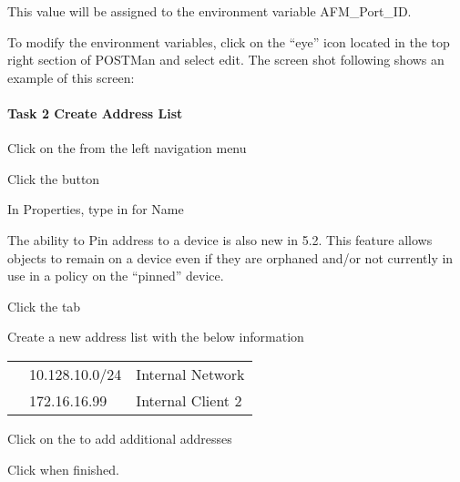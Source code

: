 \documentclass[letterpaper,10pt,english]{sphinxmanual}
\begin{document}

This value will be assigned to the environment variable AFM\_Port\_ID.

To modify the environment variables, click on the “eye” icon located
in the top right section of POSTMan and select edit. The screen shot
following shows an example of this screen:



\paragraph{Task 2 \textendash{} Create Address List}
\label{\detokenize{class1/module5/lab1:task-2-create-address-list}}
Click on the  from the left navigation menu

Click the  button

In Properties, type in  for Name

The ability to Pin address to a device is also new in 5.2. This feature
allows objects to remain on a device even if they are orphaned and/or
not currently in use in a policy on the “pinned” device.

Click the  tab

Create a new address list with the below information


\begin{savenotes}\sphinxattablestart
\centering
\begin{tabulary}{\linewidth}[t]{|T|T|T|}
\hline

&
&
\\
\hline
{}
&
10.128.10.0/24
&
Internal Network
\\
\hline
{}
&
172.16.16.99
&
Internal Client 2
\\
\hline
\end{tabulary}
\par
\sphinxattableend\end{savenotes}

Click on the \sphinxstylestrong{+} to add additional addresses


Click  when finished.
\end{document}
